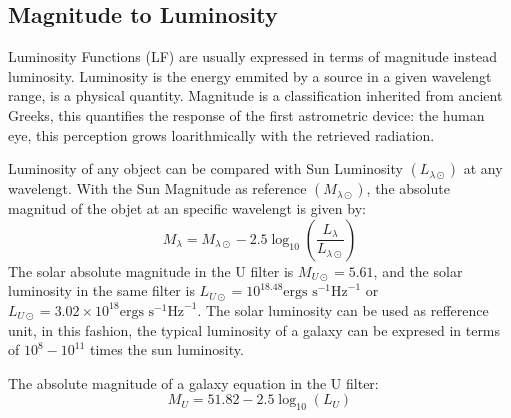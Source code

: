 

\subsection{Magnitude to Luminosity}

Luminosity Functions (LF) are usually expressed in terms of magnitude instead 
luminosity. Luminosity is the energy emmited by a source in a given wavelengt range, 
is a physical quantity. 
Magnitude is a classification inherited from ancient Greeks, this
quantifies the response of the first astrometric device: the human eye, this
perception grows loarithmically with the retrieved radiation.

Luminosity of any object can be compared with Sun Luminosity $(L_{\lambda
\odot})$ at any wavelengt. With the Sun Magnitude as reference
$(M_{\lambda \odot})$, the absolute magnitud of the objet  at an specific
wavelengt is given by: 
 \[ M_{\lambda} = M_{\lambda \odot} - 2.5 \log_{10}\left( 
\frac{L_\lambda}{L_{\lambda \odot}} \right) \]
  The solar absolute magnitude in the U filter is $M_{U\odot} = 5.61$,
and the solar luminosity in the same filter is $L_{U\odot} = 10^{18.48} 
\textrm{ergs s}^{-1}\textrm{Hz}^{-1}$ or $ L_{U\odot} = 3.02 \times 10^{18} 
\textrm{ergs s}^{-1}\textrm{Hz}^{-1}$. The solar luminosity can be used as
refference unit, in this fashion, the typical luminosity of a galaxy can be expresed in
terms of $10^{8}-10^{11}$ times the sun luminosity.

  The absolute magnitude of a galaxy equation in the U filter:
  \[ M_{U} = 51.82 - 2.5 \log_{10}(L_{U}) \]

